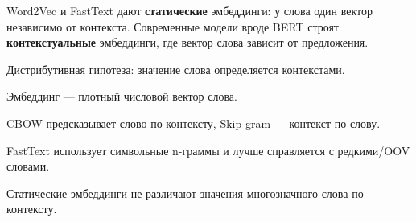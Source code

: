 Word2Vec и FastText дают \textbf{статические} эмбеддинги: у слова один вектор независимо от контекста. Современные модели вроде BERT строят \textbf{контекстуальные} эмбеддинги, где вектор слова зависит от предложения.

\begin{important}
    \item Дистрибутивная гипотеза: значение слова определяется контекстами.
    \item Эмбеддинг --- плотный числовой вектор слова.
    \item CBOW предсказывает слово по контексту, Skip-gram --- контекст по слову.
    \item FastText использует символьные n-граммы и лучше справляется с редкими/OOV словами.
    \item Статические эмбеддинги не различают значения многозначного слова по контексту.
\end{important}
